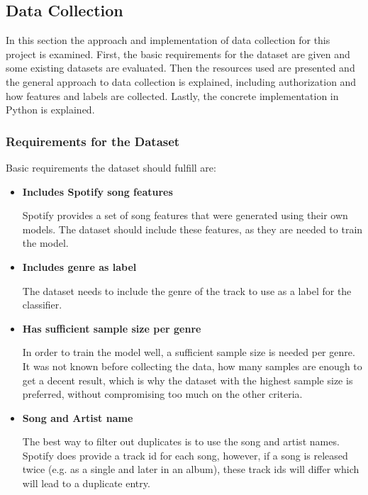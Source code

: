 \subsection{Data Collection}
\label{sec:Data Collection}

In this section the approach and implementation of data collection for this project is 
examined. First, the basic requirements for the dataset are given and some existing datasets
are evaluated. Then the resources used are presented and the general approach to data collection
is explained, including authorization and how features and labels are collected.
Lastly, the concrete implementation in Python is explained.

\subsubsection{Requirements for the Dataset}

Basic requirements the dataset should fulfill are:

\begin{itemize}
    \item \textbf{Includes Spotify song features}

    Spotify provides a set of song features that were generated using their own models.
    The dataset should include these features, as they are needed to train the model.
    
    \item \textbf{Includes genre as label}

    The dataset needs to include the genre of the track to use as a label for the classifier.

    \item \textbf{Has sufficient sample size per genre}

    In order to train the model well, a sufficient sample size is needed per genre.
    It was not known before collecting the data, how many samples are enough to get a decent result,
    which is why the dataset with the highest sample size is preferred, without compromising too
    much on the other criteria. 

    \item \textbf{Song and Artist name}

    The best way to filter out duplicates is to use the song and artist names.
    Spotify does provide a track id for each song, however, if a song is released twice
    (e.g. as a single and later in an album), these track ids will differ which will lead
    to a duplicate entry.
\end{itemize}

